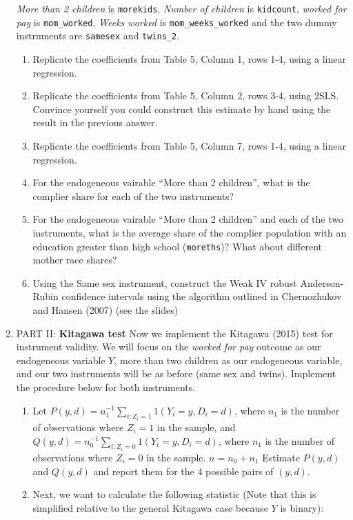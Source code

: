 \documentclass[11pt, a4paper]{article}
\begin{document}
\begin{enumerate}
  \textit{More than 2 children} is \texttt{morekids}, \textit{Number
    of children} is \texttt{kidcount}, \textit{worked for pay} is
  \texttt{mom\_worked}, \textit{Weeks worked} is
  \texttt{mom\_weeks\_worked} and the two dummy instruments are
  \texttt{samesex} and \texttt{twins\_2}.
  \begin{enumerate}
  \item Replicate the coefficients from Table 5, Column 1, rows 1-4, using a linear regression.
  \item Replicate the coefficients from Table 5, Column 2, rows 3-4,
    using 2SLS. Convince yourself you could construct this estimate by
    hand using the result in the previous answer.
  \item Replicate the coefficients from Table 5, Column 7, rows 1-4, using a linear regression.
  \item For the endogeneous vairable ``More than 2 children'', what is
    the complier share for each of the two instruments?
  \item For the endogeneous vairable ``More than 2 children'' and each
    of the two instruments, what is the average share of the complier
    population with an education greater than high school
    (\texttt{moreths})? What about different mother race shares?
  \item Using the Same sex instrument, construct the Weak IV robust
    Anderson-Rubin confidence intervals using the algorithm outlined
    in Chernozhukov and Hansen (2007) (see the slides)
  \end{enumerate}
\item PART II: \textbf{Kitagawa test} Now we implement the Kitagawa
  (2015) test for instrument validity. We will focus on the
  \textit{worked for pay} outcome as our endogeneous variable $Y$,
  more than two children as our endogeneous variable, and our two
  instruments will be as before (same sex and twins). Implement the procedure below for both instruments.
  \begin{enumerate}
  \item Let
    $P(y,d) = n_{1}^{-1} \sum_{i : Z_{i} = 1} 1(Y_{i} = y, D_{i} = d)$,
    where $n_{1}$ is the number of observations where $Z_{i} = 1$ in
    the sample, and
    $Q(y,d) = n_{0}^{-1} \sum_{i : Z_{i} = 0} 1(Y_{i} = y, D_{i} = d)$,
    where $n_{1}$ is the number of observations where $Z_{i} = 0$ in
    the sample. $n = n_{0} + n_{1}$ Estimate $P(y,d)$ and $Q(y,d)$ and
    report them for the 4 possible pairs of $(y,d)$.
  \item Next, we want to calculate the following statistic (Note that this is simplified relative to the general Kitagawa case because $Y$ is binary):

\end{enumerate}
\end{enumerate}
\end{document}

